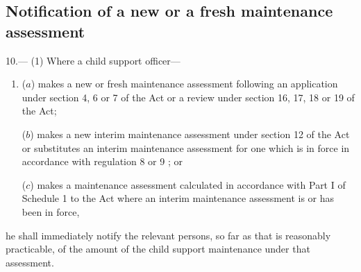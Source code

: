 \documentclass[a4paper]{article}
\newcommand{\parthead}{}
\begin{document}
\renewcommand\parthead{--- Part IV}

\subsection[10. Notification of a new or a fresh maintenance assessment]{Notification of a new or a fresh maintenance assessment}

10.—%
%
%
(1) Where a child support officer—
\begin{enumerate}\item[]
($a$) makes a new or fresh maintenance assessment following an application under section 4, 6 or 7 of the Act or a review under section 16, 17, 18 or 19 of the Act;

($b$) 
makes a new interim maintenance assessment under section 12 of the Act or  %
substitutes an interim maintenance assessment for one which is in force in accordance with regulation 8
or 9%
; or

($c$) makes a maintenance assessment calculated in accordance with Part I of Schedule 1 to the Act where an interim maintenance assessment is or has been in force,
\end{enumerate}
he shall immediately notify the relevant persons, so far as that is reasonably practicable, of the amount of the child support maintenance under that assessment.
\end{document}
